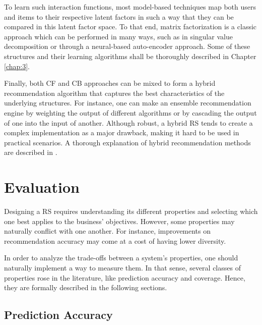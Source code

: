     To learn such interaction functions, most model-based techniques map both users and items to their respective latent factors in such a way that they can be compared in this latent factor space. To that end, matrix factorization is a classic approach which can be performed in many ways, such as in singular value decomposition or through a neural-based auto-encoder approach. Some of these structures and their learning algorithms shall be thoroughly described in Chapter \ref{chap:3}.

    Finally, both CF and CB approaches can be mixed to form a hybrid recommendation algorithm that captures the best characteristics of the underlying structures. For instance, one can make an ensemble recommendation engine by weighting the output of different algorithms or by cascading the output of one into the input of another. Although robust, a hybrid RS tends to create a complex implementation as a major drawback, making it hard to be used in practical scenarios. A thorough explanation of hybrid recommendation methods are described in \cite{10.1023/A:1021240730564}.


\section{Evaluation}
\label{sec:evaluation}



Designing a RS requires understanding its different properties and selecting which one best applies to the business' objectives. However, some properties may naturally conflict with one another. For instance, improvements on recommendation accuracy may come at a cost of having lower diversity. 

In order to analyze the trade-offs between a system's properties, one should naturally implement a way to measure them. In that sense, several classes of properties rose in the literature, like prediction accuracy and coverage. Hence, they are formally described in the following sections. 

\subsection{Prediction Accuracy}

